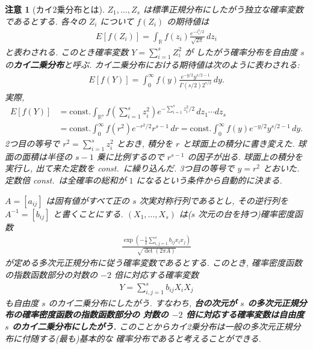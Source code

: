 \documentclass[12pt,twoside]{jarticle}
\newcommand\R{{\mathbb R}} %
\theoremstyle{jplain}
\theoremstyle{jplain}
\theoremstyle{jplain}
\newtheorem*{remark*}{注意}
\numberwithin{theorem}{section}
\numberwithin{equation}{section}
\numberwithin{figure}{section}
\numberwithin{table}{section}
\begin{document}
\begin{remark*}[カイ2乗分布とは]
$Z_1,\ldots,Z_s$ は標準正規分布にしたがう独立な確率変数であるとする.
各々の $Z_i$ について $f(Z_i)$ の期待値は
\begin{align*}
E[f(Z_i)] = \int_\R f(z_i)\frac{e^{-z_i^2/2}}{\sqrt{2\pi}}\,dz_i
\end{align*}
と表わされる.
このとき確率変数 $Y=\sum_{i=1}^s Z_i^2$ が
したがう確率分布を自由度 $s$ の{\bfseries カイ二乗分布}と呼ぶ.
カイ二乗分布における期待値は次のように表わされる:
\begin{align*}
E[f(Y)] = \int_0^\infty f(y) \frac{e^{-y/2}y^{s/2-1}}{\Gamma(s/2)2^{s/2}}\,dy.
\end{align*}
実際,
\begin{align*}
E[f(Y)]
&=\text{const.}
\int_{\R^s} f\left(\sum_{i=1}^s z_i^2\right)e^{-\sum_{i=1}^s z_i^2/2}\,dz_1\cdots dz_s
\\ &
=\text{const.} \int_0^\infty f(r^2)e^{-r^2/2}r^{s-1}\,dr
=\text{const.} \int_0^\infty f(y)e^{-y/2}y^{s/2-1}\,dy.
\end{align*}
2つ目の等号で $r^2=\sum_{i=1}^s z_i^2$ とおき, 積分を $r$ と球面上の積分に書き変えた.
球面の面積は半径の $s-1$ 乗に比例するので $r^{s-1}$ の因子が出る.
球面上の積分を実行し, 出て来た定数を const.\ に繰り込んだ.
3つ目の等号で $y=r^2$ とおいた.
定数倍 const.\ は全確率の総和が $1$ になるという条件から自動的に決まる.

$A=[a_{ij}]$ は固有値がすべて正の $s$ 次実対称行列であるとし,
その逆行列を $A^{-1}=[b_{ij}]$ と書くことにする.
$(X_1,\ldots,X_s)$ は($s$ 次元の台を持つ)確率密度函数
\begin{align*}
 \frac{\exp\left(-\frac12\sum_{i,j=1}^s b_{ij}x_ix_j\right)}{\sqrt{\det(2\pi A)}}
\end{align*}
が定める多次元正規分布に従う確率変数であるとする.
このとき, 確率密度函数の指数函数部分の対数の $-2$ 倍に対応する確率変数
\begin{align*}
Y=\sum_{i,j=1}^s b_{ij}X_i X_j
\end{align*}
も自由度 $s$ のカイ二乗分布にしたがう.
すなわち, {\bfseries 台の次元が $s$ の多次元正規分布の確率密度函数の指数函数部分の
対数の $-2$ 倍に対応する確率変数は自由度 $s$ のカイ二乗分布にしたがう.}
このことからカイ2乗分布は一般の多次元正規分布に付随する(最も)基本的な
確率分布であると考えることができる.


\end{remark*}
\end{document}
